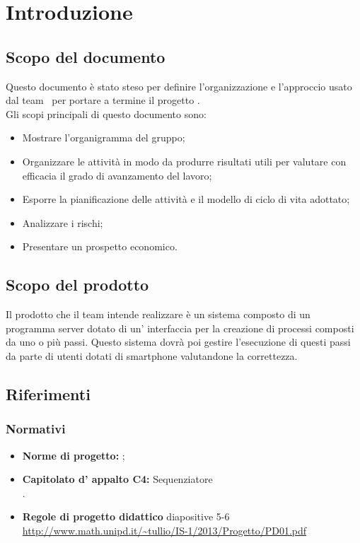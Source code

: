 \section{Introduzione}
\subsection{Scopo del documento}
Questo documento è stato steso per definire l'organizzazione e l'approccio usato dal team \gruppo ~per portare a termine il progetto \progetto. \\
Gli scopi principali di questo documento sono:
\begin{itemize}
  \item Mostrare l'organigramma del gruppo;
  \item Organizzare le attività in modo da produrre risultati utili per 
valutare con efficacia il grado di avanzamento del lavoro;
  \item	Esporre la pianificazione delle attività e il modello di ciclo di vita adottato;
  \item Analizzare i rischi;
  \item Presentare un prospetto economico.
\end{itemize}

\subsection{Scopo del prodotto}
Il prodotto che il team \gruppo intende realizzare è un sistema composto di un programma server dotato di un' interfaccia per la creazione di processi composti da uno o più passi. Questo sistema dovrà poi gestire l'esecuzione di questi passi da parte di utenti dotati di smartphone valutandone la correttezza.\\

\subsection{Riferimenti}

\subsubsection{Normativi}
\begin{itemize}
	\item \textbf{Norme di progetto:} \infoNDP ;
	\item \textbf{Capitolato d' appalto C4:} Sequenziatore\\ \capitolato .
	\item \textbf{Regole di progetto didattico} diapositive 5-6 \url{http://www.math.unipd.it/~tullio/IS-1/2013/Progetto/PD01.pdf} 
\end{itemize}
